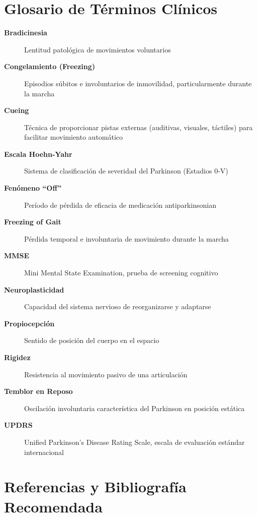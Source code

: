 \documentclass[12pt,a4paper,spanish,oneside]{book}
\begin{document}
\appendix

\chapter{Glosario de Términos Clínicos}

\begin{description}
  \item[\textbf{Bradicinesia}] Lentitud patológica de movimientos voluntarios
  
  \item[\textbf{Congelamiento (Freezing)}] Episodios súbitos e involuntarios de inmovilidad, particularmente durante la marcha
  
  \item[\textbf{Cueing}] Técnica de proporcionar pistas externas (auditivas, visuales, táctiles) para facilitar movimiento automático
  
  \item[\textbf{Escala Hoehn-Yahr}] Sistema de clasificación de severidad del Parkinson (Estadios 0-V)
  
  \item[\textbf{Fenómeno ``Off''}] Período de pérdida de eficacia de medicación antiparkinsonian
  
  \item[\textbf{Freezing of Gait}] Pérdida temporal e involuntaria de movimiento durante la marcha
  
  \item[\textbf{MMSE}] Mini Mental State Examination, prueba de screening cognitivo
  
  \item[\textbf{Neuroplasticidad}] Capacidad del sistema nervioso de reorganizarse y adaptarse
  
  \item[\textbf{Propiocepción}] Sentido de posición del cuerpo en el espacio
  
  \item[\textbf{Rigidez}] Resistencia al movimiento pasivo de una articulación
  
  \item[\textbf{Temblor en Reposo}] Oscilación involuntaria característica del Parkinson en posición estática
  
  \item[\textbf{UPDRS}] Unified Parkinson's Disease Rating Scale, escala de evaluación estándar internacional
\end{description}

\chapter{Referencias y Bibliografía Recomendada}
\end{document}
